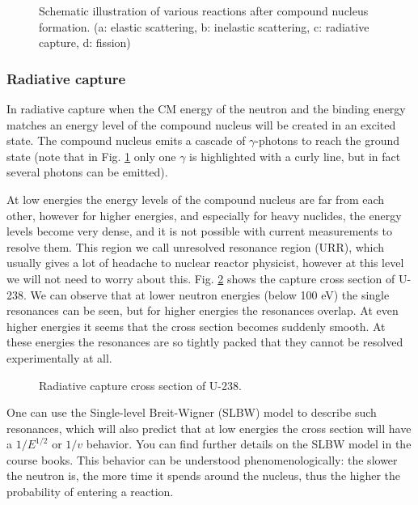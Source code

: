 \begin{figure}[ht!]
\caption{\label{fig:levels} \footnotesize{Schematic illustration of various reactions after compound nucleus formation. (a: elastic scattering, b: inelastic scattering, c: radiative capture, d: fission)}}
\end{figure}


\subsubsection*{Radiative capture}

In radiative capture when the CM energy of the neutron and the binding energy matches an energy level of the compound nucleus will be created in an excited state. The compound nucleus emits a cascade of $\gamma$-photons to reach the ground state (note that in Fig. \ref{fig:levels} only one $\gamma$ is highlighted with a curly line, but in fact several photons can be emitted).

At low energies the energy levels of the compound nucleus are far from each other, however for higher energies, and especially for heavy nuclides, the energy levels become very dense, and it is not possible with current measurements to resolve them. This region we call unresolved resonance region (URR), which usually gives a lot of headache to nuclear reactor physicist, however at this level we will not need to worry about this. Fig. \ref{fig:u238cap} shows the capture cross section of U-238. We can observe that at lower neutron energies (below 100 eV) the single resonances can be seen, but for higher energies the resonances overlap. At even higher energies it seems that the cross section becomes suddenly smooth. At these energies the resonances are so tightly packed that they cannot be resolved experimentally at all.


\begin{figure}[ht!]
\protect {}\protect
\caption{\label{fig:u238cap} \footnotesize{Radiative capture cross section of U-238.}}
\end{figure}

One can use the Single-level Breit-Wigner (SLBW) model to describe such resonances, which will also predict that at low energies the cross section will have a $1/E^{1/2}$ or $1/v$ behavior. You can find further details on the SLBW model in the course books. This behavior can be understood phenomenologically: the slower the neutron is, the more time it spends around the nucleus, thus the higher the probability of entering a reaction. 

